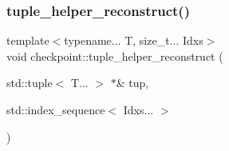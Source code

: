 \mbox{\label{namespacecheckpoint_a8370a2284f01f2fada353a096ab95f4d}} 
\subsubsection{\texorpdfstring{tuple\+\_\+helper\+\_\+reconstruct()}{tuple\_helper\_reconstruct()}}
{\footnotesize\ttfamily template$<$typename... T, size\+\_\+t... Idxs$>$ \\
void checkpoint\+::tuple\+\_\+helper\+\_\+reconstruct (\begin{DoxyParamCaption}\item[{std\+::tuple$<$ T... $>$ $\ast$\&}]{tup,  }\item[{std\+::index\+\_\+sequence$<$ Idxs... $>$}]{ }\end{DoxyParamCaption})}

